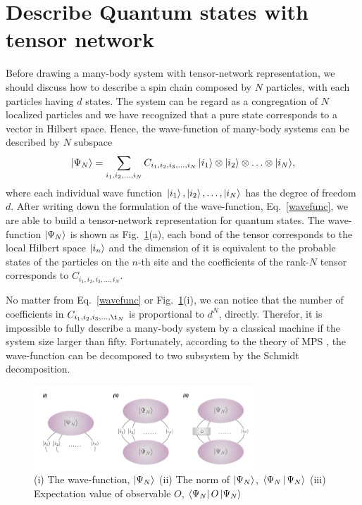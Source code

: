 \section{Describe Quantum states with tensor network} %
\label{sub:map2quan}

Before drawing a many-body system with tensor-network representation, we should discuss how to describe a spin chain composed by $N$ particles, with each particles having $d$ states. The system can be regard as a congregation of $N$ localized particles and we have recognized that a pure state corresponds to a vector in Hilbert space. Hence, the wave-function of many-body systems can be described by $N$ subspace
\begin{align}
	\Ket{\Psi_{N}} =\sum_{i_1,i_2,\ldots,i_N}{C_{i_1,i_2,i_3,\ldots,i_N}\Ket{i_1}\otimes\Ket{i_2}\otimes \ldots \otimes \Ket{i_N}},
	\label{wavefunc}
\end{align}
where each individual wave function $\Ket{i_1}, \Ket{i_2},\ldots, \Ket{i_N}$ has the degree of freedom $d$. After writing down the formulation of the wave-function, Eq.~\ref{wavefunc}, we are able to build a tensor-network representation for quantum states. The wave-function $\Ket{\Psi_N}$ is shown as Fig.~\ref{fig225}(a), each bond of the tensor corresponds to the local Hilbert space $\Ket{i_n}$ and the dimension of it is equivalent to the probable states of the particles on the $n$-th site and the coefficients of the rank-$N$ tensor corresponds to $C_{i_1,i_2,i_3,\ldots,i_N}$.

No matter from Eq.~\ref{wavefunc} or Fig.~\ref{fig225}(i), we can notice that the number of coefficients in $C_{i_1,i_2,i_3,\ldots,\i_N}$ is proportional to $d^N$, directly. Therefor, it is impossible to fully describe a many-body system by a classical machine if the system size larger than fifty. Fortunately, according to the theory of MPS \cite{PhysRevB.73.094423} \cite{PhysRevLett.75.3537}, the wave-function can be decomposed to two subsystem by the Schmidt decomposition.
\begin{figure}[ht]
	\centering
	\includegraphics[width=0.75\textwidth]{figures/fig225.png}
	\caption[Represent wave-function of quntum states of TN]{(i) The wave-function, $\Ket{\Psi_N}$ (ii) The norm of $\Ket{\Psi_N}$, $\Braket{\Psi_N|\Psi_N}$ (iii) Expectation value of observable $O$, $\Bra{\Psi_N}O\Ket{\Psi_N}$}
	\label{fig225}
\end{figure}

